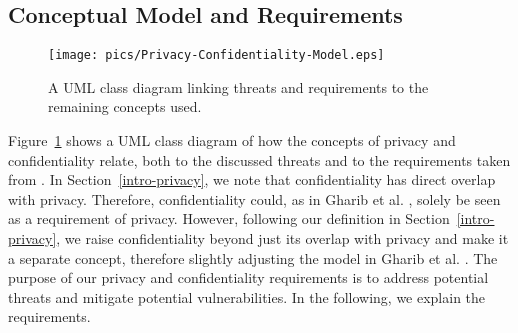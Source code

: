 \documentclass[manuscript]{acmart}
\begin{document}
\subsection{Conceptual Model and Requirements}

\begin{figure}[tbp]
    \centering
    \texttt{[image: pics/Privacy-Confidentiality-Model.eps]}
    \caption{A UML class diagram linking threats and requirements to the remaining concepts used.}
    \label{fig:PCModelExt}
\end{figure}

Figure~\ref{fig:PCModelExt} shows a UML class diagram of how the concepts of privacy and confidentiality relate, both to the discussed threats and to the requirements taken from \cite{Gharib/CoPri2020}. In Section~\ref{intro-privacy}, we note that confidentiality has direct overlap with privacy. Therefore, confidentiality could, as in Gharib et al. \cite{Gharib/CoPri2020}, solely be seen as a requirement of privacy. However, following our definition in Section~\ref{intro-privacy}, we raise confidentiality beyond just its overlap with privacy and make it a separate concept, therefore slightly adjusting the model in Gharib et al. \cite{Gharib/CoPri2020}. The purpose of our privacy and confidentiality requirements is to address potential threats and mitigate potential vulnerabilities. In the following, we explain the requirements.
\end{document}

